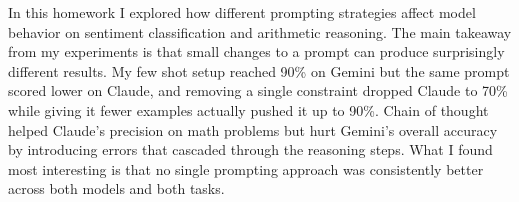 In this homework I explored how different prompting strategies affect model behavior on sentiment classification and arithmetic reasoning. The main takeaway from my experiments is that small changes to a prompt can produce surprisingly different results. My few shot setup reached 90\% on Gemini but the same prompt scored lower on Claude, and removing a single constraint dropped Claude to 70\% while giving it fewer examples actually pushed it up to 90\%. Chain of thought helped Claude's precision on math problems but hurt Gemini's overall accuracy by introducing errors that cascaded through the reasoning steps. What I found most interesting is that no single prompting approach was consistently better across both models and both tasks.